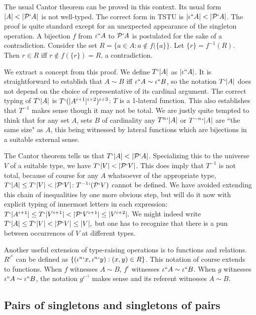\documentclass[12pt]{article}
\begin{document}
The usual Cantor theorem can be proved in this context.  Its usual form $|A| < |{\cal P}`A|$ is not well-typed.  The correct form in TSTU is $|\iota``A| < |{\cal P}`A|$.
The proof is quite standard except for an unexpected appearance of the singleton operation.  A bijection $f$ from $\iota``A$ to ${\cal P}`A$ is postulated for the sake of a contradiction.
Consider the set $R = \{a \in A:a \not\in f(\{a\}\}$.  Let $\{r\}=f^{-1}(R)$.  Then $r \in R$ iff $r \not\in f(\{r\}) = R$, a contradiction.

We extract a concept from this proof.  We define $T`|A|$ as $|\iota``A|$.  It is straightforward to establish that $A \sim B$ iff $\iota``A \sim \iota``B$, so the notation
$T`|A|$ does not depend on the choice of representative of its cardinal argument.  The correct typing of $T`|A|$ is $T`(|A^{i+1}|^{i+2})^{i+3}$:  $T$ is a 1-lateral function.  This also establishes that $T^{-1}$ makes sense though it may not be total.
We are justly quite tempted to think that for any set $A$, sets $B$ of cardinality any $T^n`|A|$ or $T^{-n}`|A|$ are ``the same size" as $A$, this being witnessed by lateral functions which are bijections in a suitable external sense.

The Cantor theorem tells us that $T`|A| < |{\cal P}`A|$.  Specializing this to the universe $V$ of a suitable type, we have $T`|V|<|{\cal P}`V|$.  This does imply that
$T^{-1}$ is not total, because of course for any $A$ whatsoever of the appropriate type, $T`|A| \leq T`|V| < |{\cal P}`V|$:  $T^{-1}`({\cal P}`V)$ cannot be defined.  We have avoided extending this chain of inequalities by one more obvious step, but will do it now with explicit typing of innermost letters in each expression:  $T`|A^{i+1}| \leq T`|V^{i+1}| < |{\cal P}`V^{i+1}| \leq |V^{i+2}|.$  We might indeed write $T`|A| \leq T`|V| < |{\cal P}`V| \leq |V|,$ but one has to recognize that there is a pun between occurrences of $V$ at different types.

Another useful extension of type-raising operations is to functions and relations.  $R^{\iota^n}$ can be defined as $\{(\iota^n`x,\iota^n`y):(x,y) \in R\}$.  This notation
of course extends to functions.  When $f$ witnesses $A \sim B$, $f^{\iota}$ witnesses $\iota``A \sim \iota``B$.  When $g$ witnesses $\iota``A \sim \iota``B$, the notation $g^{\iota^{-1}}$ makes sense and its referent witnesses $A \sim B$.

\subsection{Pairs of singletons and singletons of pairs}
\end{document}
